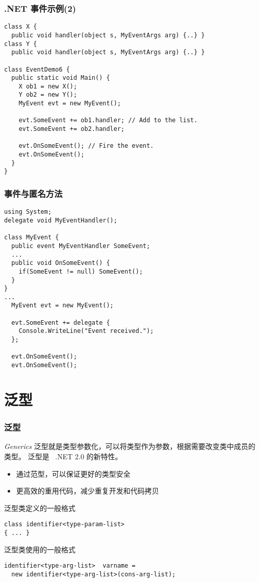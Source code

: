\begin{frame}[fragile]
\frametitle{.NET 事件示例(2)}
\begin{lstlisting}
class X {
  public void handler(object s, MyEventArgs arg) {..} }
class Y {
  public void handler(object s, MyEventArgs arg) {..} }

class EventDemo6 {
  public static void Main() {
    X ob1 = new X();
    Y ob2 = new Y();
    MyEvent evt = new MyEvent();

    evt.SomeEvent += ob1.handler; // Add to the list.
    evt.SomeEvent += ob2.handler;

    evt.OnSomeEvent(); // Fire the event.
    evt.OnSomeEvent();
  }
}
\end{lstlisting}
\end{frame}

\begin{frame}[fragile]
\frametitle{事件与匿名方法}
\begin{lstlisting}
using System;
delegate void MyEventHandler();

class MyEvent {
  public event MyEventHandler SomeEvent;
  ...
  public void OnSomeEvent() {
    if(SomeEvent != null) SomeEvent();
  }
}
...
  MyEvent evt = new MyEvent();

  evt.SomeEvent += delegate {
    Console.WriteLine("Event received.");
  };

  evt.OnSomeEvent();
  evt.OnSomeEvent();

\end{lstlisting}

\end{frame}

\section{泛型}

\begin{frame}[fragile]
\frametitle{泛型}
\begin{block}{\textit{Generics}}
  \CJKindent 泛型就是类型参数化，可以将类型作为参数，根据需要改变类中成员的类型。
  泛型是 ~.NET 2.0 的新特性。
\end{block}
\pause
\begin{itemize}
\item 通过范型，可以保证更好的类型安全
\item 更高效的重用代码，减少重复开发和代码拷贝
\end{itemize}
\pause
泛型类定义的一般格式
\begin{lstlisting}
class identifier<type-param-list>
{ ... }
\end{lstlisting}
泛型类使用的一般格式
\begin{lstlisting}
identifier<type-arg-list>  varname =
  new identifier<type-arg-list>(cons-arg-list);
\end{lstlisting}
\end{frame}


